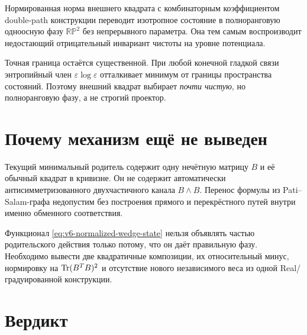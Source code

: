 \begin{proposition}
Нормированная норма внешнего квадрата с комбинаторным коэффициентом
double-path конструкции переводит изотропное состояние в полноранговую
одноосную фазу $\mathbb{RP}^2$ без непрерывного параметра. Она тем самым
воспроизводит недостающий отрицательный инвариант чистоты на уровне
потенциала.
\end{proposition}

Точная граница остаётся существенной. При любой конечной гладкой связи
энтропийный член $\varepsilon\log\varepsilon$ отталкивает минимум от
границы пространства состояний. Поэтому внешний квадрат выбирает
\emph{почти чистую}, но полноранговую фазу, а не строгий проектор.

\section{Почему механизм ещё не выведен}

Текущий минимальный родитель содержит одну нечётную матрицу $B$ и её
обычный квадрат в кривизне. Он не содержит автоматически
антисимметризованного двухчастичного канала $B\wedge B$. Перенос формулы
из Pati--Salam-графа недопустим без построения прямого и перекрёстного
путей внутри именно обменного соответствия.

\begin{nogocriterion}
Функционал \eqref{eq:v6-normalized-wedge-state} нельзя объявлять частью
родительского действия только потому, что он даёт правильную фазу.
Необходимо вывести две квадратичные композиции, их относительный минус,
нормировку на $\operatorname{Tr}(B^TB)^2$ и отсутствие нового независимого веса из
одной Real/градуированной конструкции.
\end{nogocriterion}

\section{Вердикт}

